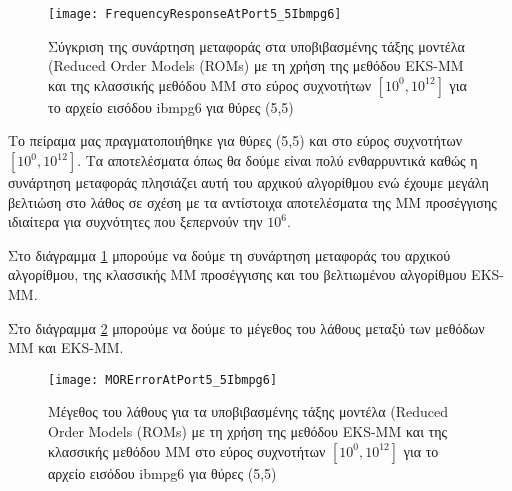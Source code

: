 \begin{figure}[h!]
\caption{Σύγκριση της συνάρτηση μεταφοράς στα υποβιβασμένης τάξης μοντέλα (\textlatin{Reduced Order Models (ROMs)} με τη χρήση της μεθόδου \textlatin{EKS-MM} και της κλασσικής μεθόδου \textlatin{MM} στο εύρος συχνοτήτων $[10^0, 10^{12}]$ για το αρχείο εισόδου \textlatin{ibmpg6} για θύρες (5,5)}
\centering
\texttt{[image: FrequencyResponseAtPort5\_5Ibmpg6]}
\FloatBarrier
\label{fig:6_1}
\end{figure}

Το πείραμα μας πραγματοποιήθηκε για θύρες (5,5) και στο εύρος συχνοτήτων $[10^0, 10^{12}]$. Τα αποτελέσματα όπως θα δούμε είναι πολύ ενθαρρυντικά καθώς η συνάρτηση μεταφοράς πλησιάζει αυτή του αρχικού αλγορίθμου ενώ έχουμε μεγάλη βελτιώση στο λάθος σε σχέση με τα αντίστοιχα αποτελέσματα της \textlatin{MM} προσέγγισης ιδιαίτερα για συχνότητες που ξεπερνούν την $10^6$.

Στο διάγραμμα \ref{fig:6_1} μπορούμε να δούμε τη συνάρτηση μεταφοράς του αρχικού αλγορίθμου, της κλασσικής \textlatin{MM} προσέγγισης και του βελτιωμένου αλγορίθμου \textlatin{EKS-MM}.

Στο διάγραμμα \ref{fig:6_2} μπορούμε να δούμε το μέγεθος του λάθους μεταξύ των μεθόδων \textlatin{MM} και \textlatin{EKS-MM}.

\begin{figure}[h!]
\caption{Μέγεθος του λάθους για τα υποβιβασμένης τάξης μοντέλα (\textlatin{Reduced Order Models (ROMs)} με τη χρήση της μεθόδου \textlatin{EKS-MM} και της κλασσικής μεθόδου \textlatin{MM} στο εύρος συχνοτήτων $[10^0, 10^{12}]$ για το αρχείο εισόδου \textlatin{ibmpg6} για θύρες (5,5)}
\centering
\texttt{[image: MORErrorAtPort5\_5Ibmpg6]}
\FloatBarrier
\label{fig:6_2}
\end{figure}
